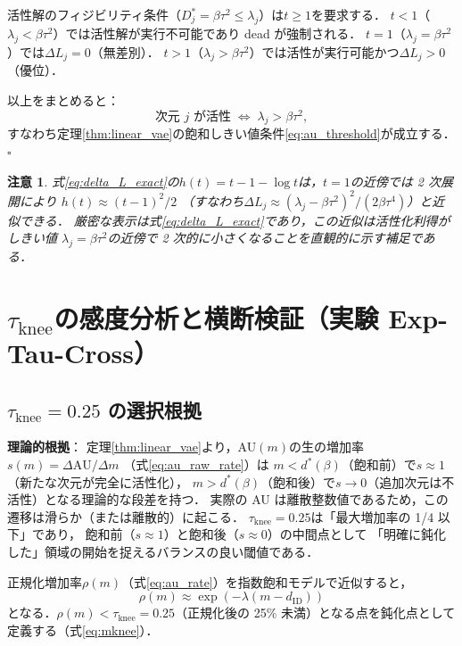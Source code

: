 \documentclass[11pt,a4paper]{jsarticle}
\newtheorem{remark}{注意}
\newcommand{\dID}{d_{\mathrm{ID}}}
\begin{document}
活性解のフィジビリティ条件（$D_j^* = \beta\tau^2 \leq \lambda_j$）は$t \geq 1$を要求する．
$t < 1$（$\lambda_j < \beta\tau^2$）では活性解が実行不可能であり dead が強制される．
$t = 1$（$\lambda_j = \beta\tau^2$）では$\Delta L_j = 0$（無差別）．
$t > 1$（$\lambda_j > \beta\tau^2$）では活性が実行可能かつ$\Delta L_j > 0$（優位）．

以上をまとめると：
\begin{equation}
  \text{次元 }j\text{ が活性} \;\Longleftrightarrow\; \lambda_j > \beta\tau^2,
\end{equation}
すなわち定理\ref{thm:linear_vae}の飽和しきい値条件\eqref{eq:au_threshold}が成立する．\hfill$\square$

\begin{remark}
式\eqref{eq:delta_L_exact}の$h(t) = t - 1 - \log t$は，$t = 1$の近傍では 2 次展開により
$h(t) \approx (t-1)^2/2$
（すなわち$\Delta L_j \approx (\lambda_j - \beta\tau^2)^2/(2\beta\tau^4)$）と近似できる．
厳密な表示は式\eqref{eq:delta_L_exact}であり，この近似は活性化利得がしきい値
$\lambda_j = \beta\tau^2$の近傍で 2 次的に小さくなることを直観的に示す補足である．
\end{remark}

\section{$\tau_{\mathrm{knee}}$の感度分析と横断検証（実験 Exp-Tau-Cross）}\label{app:tau_knee}

\subsection*{$\tau_{\mathrm{knee}} = 0.25$ の選択根拠}

\textbf{理論的根拠}：
定理\ref{thm:linear_vae}より，AU$(m)$の生の増加率$s(m) = \Delta\mathrm{AU}/\Delta m$
（式\eqref{eq:au_raw_rate}）は
$m < d^*(\beta)$（飽和前）で$s \approx 1$（新たな次元が完全に活性化），
$m > d^*(\beta)$（飽和後）で$s \to 0$（追加次元は不活性）となる理論的な段差を持つ．
実際の AU は離散整数値であるため，この遷移は滑らか（または離散的）に起こる．
$\tau_{\mathrm{knee}} = 0.25$は「最大増加率の 1/4 以下」であり，
飽和前（$s \approx 1$）と飽和後（$s \approx 0$）の中間点として
「明確に鈍化した」領域の開始を捉えるバランスの良い閾値である．

正規化増加率$\rho(m)$（式\eqref{eq:au_rate}）を指数飽和モデルで近似すると，
\begin{equation}
  \rho(m) \approx \exp(-\lambda (m - \dID))
  \label{eq:knee_curvature}
\end{equation}
となる．$\rho(m) < \tau_{\mathrm{knee}} = 0.25$（正規化後の 25\% 未満）となる点を鈍化点として定義する（式\eqref{eq:mknee}）．
\end{document}
